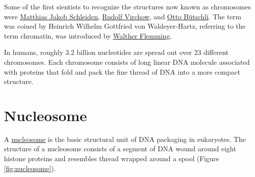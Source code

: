 Some of the first sientists to recognize the structures now known as chromosomes were \href{https://en.wikipedia.org/wiki/Matthias_Jakob_Schleiden}{Matthias Jakob Schleiden}, \href{https://en.wikipedia.org/wiki/Rudolf_Virchow}{Rudolf Virchow}, and \href{https://en.wikipedia.org/wiki/Otto_B\%C3\%BCtschli}{Otto Bütschli}. The term was coined by Heinrich Wilhelm Gottfried von Waldeyer-Hartz, referring to the term chromatin, was introduced by \href{https://en.wikipedia.org/wiki/Walther_Flemming}{Walther Flemming}.

In humans, roughly 3.2 billion nucleotides are spread out over 23 different chromosomes. Each chromosome consists of long linear DNA molecule associated with proteins that fold and pack the fine thread of DNA into a more compact structure.

\hypertarget{nucleosome}{%
\section{Nucleosome}\label{nucleosome}}

A \href{https://en.wikipedia.org/wiki/Nucleosome}{nucleosome} is the basic structural unit of DNA packaging in eukaryotes. The structure of a nucleosome consists of a segment of DNA wound around eight histone proteins and resembles thread wrapped around a spool (Figure \ref{fig:nucleosome}).



